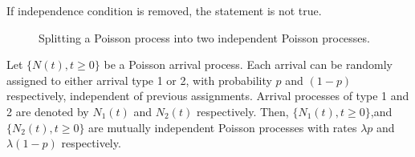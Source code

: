 \documentclass[a4paper,10pt]{article}
\begin{document}
\begin{rem}If independence condition is removed, the statement is not true.
\end{rem}
\begin{figure}[hhhh]
\center
  
 \caption{Splitting a Poisson process into two independent Poisson processes.}
\label{Fig:IndependentSplitting}
\end{figure}

\begin{thm} Let $\{N(t), t \geqslant 0\}$ be a Poisson arrival process. Each arrival can be randomly assigned to either arrival type 1 or 2, with probability $p$ and $(1-p)$ respectively, independent of previous assignments. Arrival processes of type 1 and 2 are denoted by $N_1(t)$ and $N_2(t)$ respectively. Then, $\{N_{1}(t), t \geqslant 0\}$,and $\{N_{2}(t), t \geqslant 0\}$ are mutually independent Poisson processes with rates $\lambda p$ and $\lambda (1-p)$ respectively.  
\end{thm}
\end{document}
